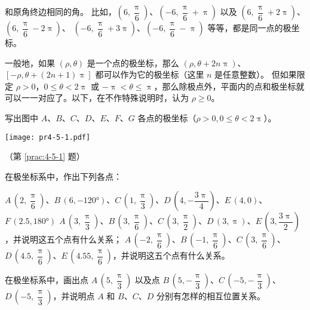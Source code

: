 \medskip\noindent
和原角终边相同的角。
比如，$\left(6,\dfrac{\uppi}{6}\right)$、$\left(-6,\dfrac{\uppi}{6}+\uppi\right)$ 以及 $\left(6,\dfrac{\uppi}{6}+{2\uppi}\right)$、$\left(6,\dfrac{\uppi}{6}-2\uppi\right)$、 $\left(-6,\dfrac{\uppi}{6}+3\uppi\right)$、$\left(-6,\dfrac{\uppi}{6}-\uppi\right)$ 等等，都是同一点的极坐标。

\smallskip
一般地，如果 $(\rho,\theta)$ 是一个点的极坐标，那么 $\left(\rho,\theta+2n\uppi\right)$、$\left[-\rho,\theta+\left(2n+1\right)\uppi\right]$ 都可以作为它的极坐标（这里 $n$ 是任意整数）。
但如果限定 $\rho>0$，$0\leqslant\theta<2\uppi$ 或 $-\uppi<\theta\leqslant\uppi$，那么除极点外，平面内的点和极坐标就可以一一对应了。以下，在不作特殊说明时，认为 $\rho\geqslant 0$。

\begin{Practice}
  \begin{question}
    \item\label{prac:4-5-1} 写出图中 $A$、$B$、$C$、$D$、$E$、$F$、$G$ 各点的极坐标（$\rho>0,0 \leqslant\theta<2\uppi$）。
    \begin{figurehere}
      \begin{minipage}{\linewidth}\centering
        \texttt{[image: pr4-5-1.pdf]}
        \caption*{（第 \ref{prac:4-5-1} 题）}
      \end{minipage}
    \end{figurehere}
    \item 在极坐标系中，作出下列各点：
    \begin{tasks}
      \task $A\,\left(2,\dfrac{\uppi}{6}\right)$、$B\,(6,-\ang{120})$、$C\,\left(1,\dfrac{\uppi}{3}\right)$、$D\,\left(4,-\dfrac{3\uppi}{4}\right)$、$E\,(4,0)$、$F\,(2.5,\ang{180})$
      \task $A\,\left(3,\dfrac{\uppi}{3}\right)$、$B\,\left(3,\dfrac{\uppi}{6}\right)$、$C\,\left(3,\dfrac{\uppi}{2}\right)$、$D\,(3,\uppi)$、$E\,\left(3,\dfrac{3\uppi}{2}\right)$，并说明这五个点有什么关系；
      \task $A\,\left(-2,\dfrac{\uppi}{6}\right)$、$B\,\left(-1,\dfrac{\uppi}{6}\right)$、$C\,\left(3,\dfrac{\uppi}{6}\right)$、$D\,\left(4.5,\dfrac{\uppi}{6}\right)$、$E\,\left(4.55,\dfrac{\uppi}{6}\right)$，并说明这五个点有什么关系。
    \end{tasks}
    \item 在极坐标系中，画出点 $A\,\left(5,\dfrac{\uppi}{3}\right)$ 以及点 $B\,\left(5,-\dfrac{\uppi}{3}\right)$、$C\,\left(-5,-\dfrac{\uppi}{3}\right)$、$D\,\left(-5,\dfrac{\uppi}{3}\right)$，并说明点 $A$ 和 $B$、$C$、$D$ 分别有怎样的相互位置关系。
  \end{question}
\end{Practice}
